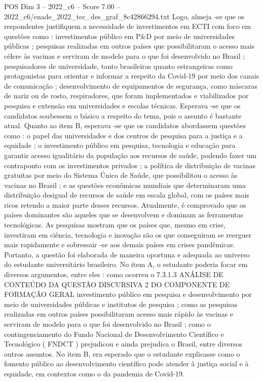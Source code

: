 \begin{textsample}{POS Dim 3 – 2022\_c6 – Score 7.00 – 2022\_c6/enade\_2022\_tec\_des\_graf\_8c42866294.txt}
Logo, almeja -se que os respondentes justifiquem a necessidade de investimentos em ECTI com foco em questões como : investimentos público em P\&D por meio de universidades públicas ; pesquisas realizadas em outros países que possibilitaram o acesso mais célere às vacinas e serviram de modelo para o que foi desenvolvido no Brasil ; pesquisadores de universidade, tanto brasileiras quanto estrangeiras como protagonistas para orientar e informar a respeito da Covid-19 por meio dos canais de comunicação ; desenvolvimento de equipamentos de segurança, como máscaras de nariz ou de rosto, respiradores, que foram implementados e viabilizados por pesquisa e extensão em universidades e escolas técnicas.
Esperava -se que os candidatos soubessem o básico a respeito do tema, pois o assunto é bastante atual.
Quanto ao item B, esperava -se que os candidatos abordassem questões como : o papel das universidades e dos centros de pesquisa para a justiça e a equidade ; o investimento público em pesquisa, tecnologia e educação para garantir acesso igualitário da população aos recursos de saúde, podendo fazer um contraponto com os investimentos privados ; a política de distribuição de vacinas gratuitas por meio do Sistema Único de Saúde, que possibilitou o acesso às vacinas no Brasil ; e as questões econômicas mundiais que determinaram uma distribuição desigual de recursos de saúde em escala global, com os países mais ricos retendo a maior parte desses recursos.
Atualmente, é comprovado que os países dominantes são aqueles que se desenvolvem e dominam as ferramentas tecnológicas.
As pesquisas mostram que os países que, mesmo em crise, investiram em ciência, tecnologia e inovação são os que conseguiram se reerguer mais rapidamente e sobressair -se aos demais países em crises pandêmicas.
Portanto, a questão foi elaborada de maneira oportuna e adequada ao universo do estudante universitário brasileiro.
No item A, o estudante poderia focar em diversos argumentos, entre eles : como ocorreu o 7.3.1.3 ANÁLISE DE CONTEÚDO DA QUESTÃO DISCURSIVA 2 DO COMPONENTE DE FORMAÇÃO GERAL investimento público em pesquisa e desenvolvimento por meio de universidades públicas e institutos de pesquisa ; como as pesquisas realizadas em outros países possibilitaram acesso mais rápido às vacinas e serviram de modelo para o que foi desenvolvido no Brasil ; como o contingenciamento do Fundo Nacional de Desenvolvimento Científico e Tecnológico ( FNDCT ) prejudicou e ainda prejudica o Brasil, entre diversos outros assuntos.
No item B, era esperado que o estudante explicasse como o fomento público ao desenvolvimento científico pode atender à justiça social e à equidade, em contextos como o da pandemia de Covid-19.

\end{textsample}
